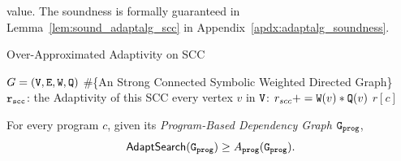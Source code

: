 value.%
The soundness is formally guaranteed in Lemma~\ref{lem:sound_adaptalg_scc} in Appendix~\ref{apdx:adaptalg_soundness}.

        \begin{algorithm}
          \caption{
          {Over-Approximated Adaptivity on SCC}
          \label{alg:overadp_alg}
          }
          \begin{algorithmic}[1]
          \REQUIRE $G = (\mathtt{V}, \mathtt{E}, \mathtt{W}, \mathtt{Q})$ \#\{An Strong Connected Symbolic Weighted Directed Graph\}
          \\
          $\mathtt{r_{scc}}$: the Adaptivity of this SCC
           every vertex $v$ in $\mathtt{V}$:
          \STATE  \qquad $r_{scc} += \mathtt{W}(v)*\mathtt{Q}(v)$  
          \RETURN $r[c]$
          \end{algorithmic}
          \end{algorithm}
\begin{thm}
    \label{thm:sound_adaptalg}
    For every program $c$, given its \emph{Program-Based Dependency Graph} $\mathtt{{G_{prog}}}$,
     $$\mathsf{AdaptSearch}(\mathtt{{G_{prog}}}) \geq A_{\mathtt{prog}}(\mathtt{{G_{prog}}}).$$
\end{thm}
